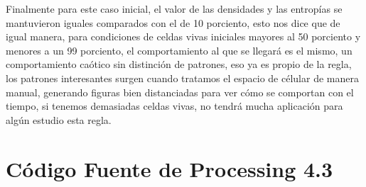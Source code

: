 \documentclass{article}
\begin{document}
\begin{itemize}
		Finalmente para este caso inicial, el valor de las densidades y las entropías se mantuvieron iguales comparados con el de 10 porciento, esto nos dice que de igual manera, para condiciones de celdas vivas iniciales mayores al 50 porciento y menores a un 99 porciento, el comportamiento al que se llegará es el mismo, un comportamiento caótico sin distinción de patrones, eso ya es propio de la regla, los patrones interesantes surgen cuando tratamos el espacio de célular de manera manual, generando figuras bien distanciadas para ver cómo se comportan con el tiempo, si tenemos demasiadas celdas vivas, no tendrá mucha aplicación para algún estudio esta regla. 
 		
 	\end{itemize}
 	
 	\section{Código Fuente de Processing 4.3}
\end{document}
